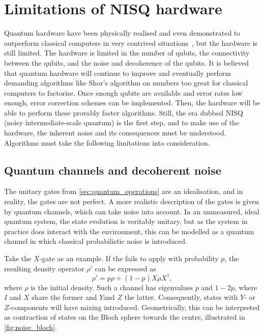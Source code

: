 \section{Limitations of NISQ hardware}
\label{sec:nisq}
Quantum hardware have been physically realised and even demonstrated to outperform classical computers in very contrived situations~\autocite{arute2019, zhong2020, madsen2022}, but the hardware is still limited.
The hardware is limited in the number of qubits, the connectivity between the qubits, and the noise and decoherence of the qubits.
It is believed that quantum hardware will continue to improve and eventually perform demanding algorithms like Shor's algorithm on numbers too great for classical computers to factorise.
Once enough qubits are available and error rates low enough, error correction schemes can be implemented.
Then, the hardware will be able to perform these provably faster algorithms.
Still, the era dubbed NISQ (noisy intermediate-scale quantum) is the first step, and to make use of the hardware, the inherent noise and its consequences must be understood.
Algorithms must take the following limitations into consideration.

\subsection{Quantum channels and decoherent noise}
The unitary gates from \cref{sec:quantum_operations} are an idealisation, and in reality, the gates are not perfect.
A more realistic description of the gates is given by quantum channels, which can take noise into account.
In an unmeasured, ideal quantum system, the state evolution is veritably unitary, but as the system in practice does interact with the environment, this can be modelled as a quantum channel in which classical probabilistic noise is introduced.

Take the $X$-gate as an example.
If the fails to apply with probability $p$, the resulting density operator $\rho'$ can be expressed as
\begin{equation}
    \rho' = p\rho + (1-p)X\rho X^\dagger,
\end{equation}
where $\rho$ is the initial density.
Such a channel has eigenvalues $p$ and $1-2p$, where $I$ and $X$ share the former and $Y$and $Z$ the latter.
Consequently, states with $Y$- or $Z$-components will have mixing introduced.
Geometrically, this can be interpreted as contraction of states on the Bloch sphere towards the centre, illustrated in \cref{fig:noise_bloch}.

